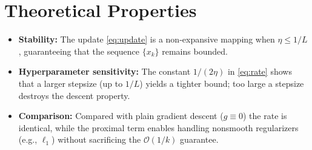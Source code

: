 \documentclass{article}
\begin{document}
\section*{Theoretical Properties}
\begin{itemize}
\item \textbf{Stability:} The update \eqref{eq:update} is a non‑expansive mapping when $\eta\le 1/L$, guaranteeing that the sequence $\{x_{k}\}$ remains bounded.
\item \textbf{Hyperparameter sensitivity:} The constant $1/(2\eta)$ in \eqref{eq:rate} shows that a larger stepsize (up to $1/L$) yields a tighter bound; too large a stepsize destroys the descent property.
\item \textbf{Comparison:} Compared with plain gradient descent ($g\equiv0$) the rate is identical, while the proximal term enables handling nonsmooth regularizers (e.g., $\ell_{1}$) without sacrificing the $\mathcal{O}(1/k)$ guarantee.
\end{itemize}
\end{document}

